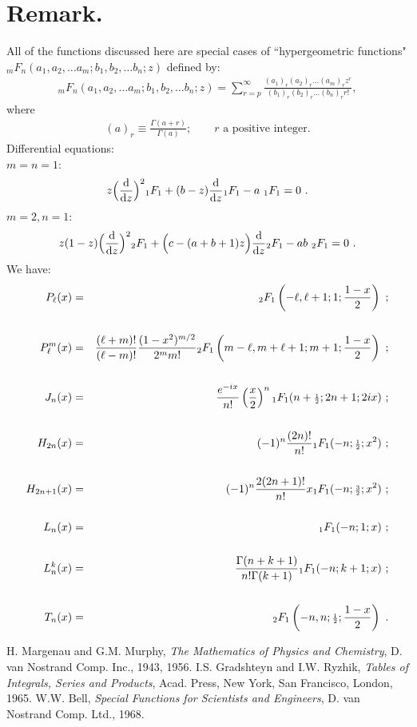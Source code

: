 \documentclass[12pt]{article}
\def\dd{{\rm d}}  \def\bra{\langle}   \def\ket{\rangle}
\def\fractje#1#2{{\scriptstyle{#1\over#2}}}
\def\halfje{\fractje12}
\renewcommand{\^}[1]{\hat{#1}}
\newcommand{\be}{\begin{eqnarray}}
\newcommand{\ee}{\end{eqnarray}}
\newcommand{\nn}{\nonumber\\}
\newcommand{\newsec}[1]{\section{#1}\setcounter{equation}{0}}
\begin{document}
\newsec{Remark.}All of the functions discussed here are special
cases of ``hypergeometric functions"\\ \({}_mF_n(a_1,a_2,\dots
a_m;b_1,b_2,\dots b_n;z)\) defined by: \be {}_mF_n(a_1,a_2,\dots
a_m;b_1,b_2,\dots b_n;z) =
\sum_{r=p}^{\infty}\frac{(a_1)_r(a_2)_r\dots(a_m)_rz^r}{(b_1)_r(b_2)_r\dots(b_n)_rr!},\ee
where \be (a)_r
\equiv\frac{\Gamma(a+r)}{\Gamma(a)};\quad\quad\mbox{$r$ a positive
integer.} \ee Differential equations:\\ $m=n=1$: \be
z\Big({\dd\over\dd z}\Big)^2{}_1F_1+(b-z){\dd\over\dd
z}{}_1F_1-a\,\,{}_1F_1=0\ .\ee $m=2,n=1$:\be
z(1-z)\Big({\dd\over\dd
z}\Big)^2{}_2F_1+\Big(c-(a+b+1)z\Big){\dd\over\dd
z}{}_2F_1-ab\,\,{}_2F_1=0\ .\ee We have: \be P_\ell(x)
&=& {}_2F_1\left(-\ell,\ell+1;1;{1-x\over2}\right)\ ;\nn\\
P_\ell^m(x) &=&
\frac{(\ell+m)!}{(\ell-m)!}\frac{(1-x^2)^{m/2}}{2^mm!}{}_2F_1\left(m-\ell,m+\ell+1;m+1;{1-x\over2}\right)\
;\nn\\
J_n(x)&=&\frac{e^{-ix}}{n!}\left(\frac{x}{2}\right)^n{}_1F_1(n+\halfje;2n+1;2ix)\
;\nn\\
H_{2n}(x)&=&(-1)^{n}\frac{(2n)!}{n!}{}_1F_1(-n;\halfje;x^2)\
;\nn\\
H_{2n+1}(x)&=&(-1)^{n}\frac{2(2n+1)!}{n!}x{}_1F_1(-n;\fractje{3}{2};x^2)\
;\nn\\
L_n(x)&=&{}_1F_1(-n;1;x)\ ;\nn\\
L_n^k(x)&=&\frac{\Gamma(n+k+1)}{n!\Gamma(k+1)}{}_1F_1(-n;k+1;x)\
;\nn\\ T_n(x)&=&{}_2F_1\left(-n,n;\halfje;{1-x\over 2}\right)\ .
\ee\pagebreak[4]

\begin{thebibliography}{99}

\bibitem{MM} H. Margenau and G.M. Murphy, \emph{The Mathematics
of Physics and Chemistry}, D. van Nostrand Comp. Inc., 1943, 1956.
 I.S. Gradshteyn and I.W. Ryzhik,\emph{ Tables of Integrals,
Series and Products}, Acad. Press, New York, San Francisco,
London, 1965.
\bibitem{WB} W.W. Bell, \emph{Special Functions for Scientists and
Engineers}, D. van Nostrand Comp. Ltd., 1968.

\end{thebibliography}
\end{document}
